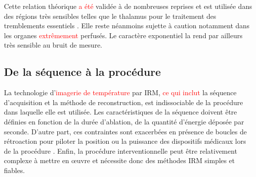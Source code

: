 Cette relation théorique \textcolor{red}{a été} validée à de nombreuses reprises et est utilisée dans des régions très sensibles telles que le thalamus pour le traitement des tremblements essentiels \cite{huang2018predicting}. Elle reste néanmoins sujette à caution \cite{o2012estimation} notamment dans les organes \textcolor{red}{extrêmement} perfusés. Le caractère exponentiel la rend par ailleurs très sensible au bruit de mesure.

\subsection{De la séquence à la procédure}

La technologie d'\textcolor{red}{imagerie de température} par IRM, \textcolor{red}{ce qui inclut} la séquence d'acquisition et la méthode de reconstruction, est indissociable de la procédure dans laquelle elle est utilisée. Les caractéristiques de la séquence doivent être définies en fonction de la durée d'ablation, de la quantité d'énergie déposée par seconde. D'autre part, ces contraintes sont exacerbées en présence de boucles de rétroaction pour piloter la position ou la puissance des dispositifs médicaux lors de la procédure \cite{bour2018real,desclides2023real, ozenne2016automatic}. Enfin, la procédure interventionnelle peut être relativement complexe à mettre en œuvre et nécessite donc des méthodes IRM simples et fiables.\\